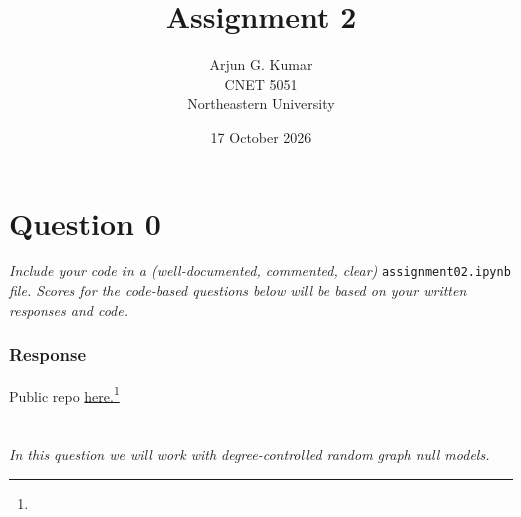 \documentclass{article}
\title{\textbf{Assignment 2}}
\author{Arjun G. Kumar\\
CNET 5051\\
Northeastern University}
\date{17 October 2026}
\newcommand{\response}{\subsubsection*{Response}}
\begin{document}
\maketitle
\tableofcontents
\listoffigures
\section*{Question 0}
\textit{Include your code in a (well-documented, commented, clear) }\texttt{assignment02.ipynb}\textit{ file. Scores for the code-based questions below will be based on your written responses and code.}
\response
Public repo \href{https://github.com/14arjunk/CNET5051_Assignments/tree/main/Assignment%202%20Files}{here.}\footnote{\repourl}
\section{}
\textit{In this question we will work with degree-controlled random graph null models.}
\end{document}
